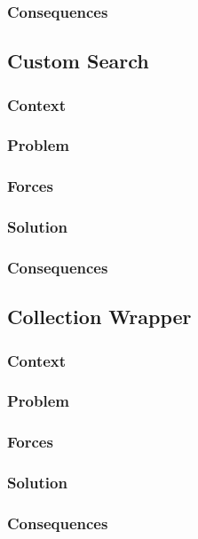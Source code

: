 \documentclass[sigconf]{acmart}
\begin{document}
\subsubsection*{Consequences}


\subsection{Custom Search}
\subsubsection*{Context}
\subsubsection*{Problem}
\subsubsection*{Forces}
\subsubsection*{Solution}
\subsubsection*{Consequences}


\subsection{Collection Wrapper}
\subsubsection*{Context}
\subsubsection*{Problem}
\subsubsection*{Forces}
\subsubsection*{Solution}
\subsubsection*{Consequences}




\end{document}
